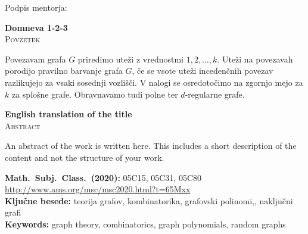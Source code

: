 \documentclass[12pt,a4paper,twoside]{article}
\newcommand{\naslovdela}{Domneva 1-2-3}
\newcommand{\kljucnebesede}{teorija grafov\sep kombinatorika\sep grafovski polinomi,\sep naključni grafi} %
\newcommand{\keywords}{graph theory\sep combinatorics\sep graph polynomials\sep random graphs} %
\newcommand{\sep}{, }  %
\theoremstyle{definition} %
\theoremstyle{plain} %
\numberwithin{equation}{section}  %
\begin{document}
\vspace{2cm}
\hspace*{\fill} Podpis mentorja: \phantom{prostor za podpis}


\cleardoublepage
{}

\begin{center}
\textbf{\naslovdela} \\[3mm]
\textsc{Povzetek} \\[2mm]
\end{center}
Povezavam grafa $G$ priredimo uteži z vrednostmi $1,2,\ldots,k$. Uteži na povezavah porodijo pravilno barvanje grafa $G$, če se vsote uteži incedenčnih povezav razlikujejo za vsaki sosednji vozlišči. V nalogi se osredotočimo na zgornjo mejo za $k$ za splošne grafe. Obravnavamo tudi polne ter $d$-regularne grafe. 

\vfill
\begin{center}
\textbf{English translation of the title} \\[3mm] %
\textsc{Abstract}\\[2mm]
\end{center}

An abstract of the work is written here. This includes a short description of
the content and not the structure of your work.

\vfill\noindent
\textbf{Math.~Subj.~Class.~(2020):} 05C15, 05C31, 05C80    
\url{http://www.ams.org/msc/msc2020.html?t=65Mxx} \\[1mm]
\textbf{Ključne besede:} \kljucnebesede \\[1mm]
\textbf{Keywords:} \keywords

\cleardoublepage

\setcounter{page}{1}    %
\end{document}
